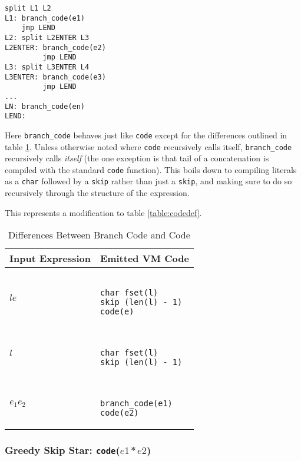 \begin{verbatim}
split L1 L2
L1: branch_code(e1)
    jmp LEND
L2: split L2ENTER L3
L2ENTER: branch_code(e2)
         jmp LEND
L3: split L3ENTER L4
L3ENTER: branch_code(e3)
         jmp LEND
...
LN: branch_code(en)
LEND:
\end{verbatim}

Here \verb'branch_code' behaves just like \verb'code' except 
for the differences outlined in table \ref{table:branchcode}.
Unless otherwise noted where \verb'code' recursively calls
itself, \verb'branch_code' recursively calls \emph{itself}
(the one exception is that tail of a concatenation is
compiled with the standard \verb'code' function).
This boils down to compiling literals as a \verb'char' followed
by a \verb'skip' rather than just a \verb'skip', and
making sure to do so recursively through the structure
of the expression.

\begin{table}
\caption{Differences Between Branch Code and Code}
This represents a modification to table \ref{table:codedef}.
\label{table:branchcode}
\centering
\begin{tabular}{| l | l |} \hline
Input Expression & Emitted VM Code \\ \hline
$l e$ &
  \begin{minipage}{4cm}
  \begin{verbatim}

char fset(l)
skip (len(l) - 1)
code(e)
  \end{verbatim}
  \end{minipage}
  \\ \hline
$l$ &
  \begin{minipage}{4cm}
  \begin{verbatim}

char fset(l)
skip (len(l) - 1)
  \end{verbatim}
  \end{minipage}
  \\ \hline
$e_1 e_2$ &
  \begin{minipage}{4cm}
  \begin{verbatim}

branch_code(e1)
code(e2)
  \end{verbatim}
  \end{minipage}
  \\ \hline
\end{tabular}
\end{table}
 
\subsubsection{Greedy Skip Star: {\tt code}($e1*e2$)}

